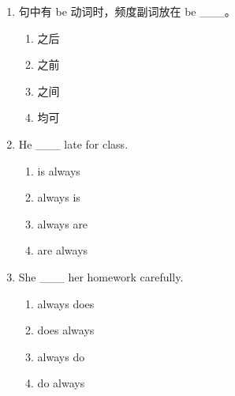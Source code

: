 \documentclass[11pt,a4paper]{ctexart}
\begin{document}
\begin{enumerate}[leftmargin=*,itemsep=4pt]
\begin{enumerate}[label=\Alph*.,leftmargin=2em,itemsep=1pt,topsep=2pt]
\item 系动词
\item 助动词
\item 情态动词
\end{enumerate}
\item 句中有 be 动词时，频度副词放在 be \_\_\_。
\begin{enumerate}[label=\Alph*.,leftmargin=2em,itemsep=1pt,topsep=2pt]
\item 之后
\item 之前
\item 之间
\item 均可
\end{enumerate}
\item He \_\_\_ late for class.
\begin{enumerate}[label=\Alph*.,leftmargin=2em,itemsep=1pt,topsep=2pt]
\item is always
\item always is
\item always are
\item are always
\end{enumerate}
\item She \_\_\_ her homework carefully.
\begin{enumerate}[label=\Alph*.,leftmargin=2em,itemsep=1pt,topsep=2pt]
\item always does
\item does always
\item always do
\item do always
\end{enumerate}
\end{enumerate}
\end{document}
